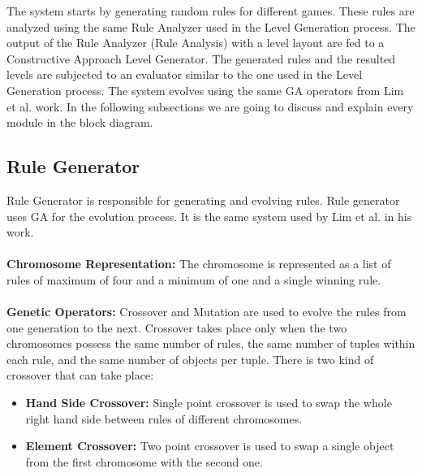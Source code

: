 
The system starts by generating random rules for different games. These rules are analyzed using the same Rule Analyzer used in the Level Generation process. The output of the Rule Analyzer (Rule Analysis) with a level layout are fed to a Constructive Approach Level Generator. The generated rules and the resulted levels are subjected to an evaluator similar to the one used in the Level Generation process. The system evolves using the same GA operators from Lim et al. work\cite{puzzleScriptGeneration}. In the following subsections we are going to discuss and explain every module in the block diagram.

\subsection{Rule Generator}
Rule Generator is responsible for generating and evolving rules. Rule generator uses GA for the evolution process. It is the same system used by Lim et al.\cite{puzzleScriptGeneration} in his work.\\\\
\textbf{Chromosome Representation:} The chromosome is represented as a list of rules of maximum of four and a minimum of one and a single winning rule. \\\\
\textbf{Genetic Operators:} Crossover and Mutation are used to evolve the rules from one generation to the next. Crossover takes place only when the two chromosomes possess the same number of rules, the same number of tuples within each rule, and the same number of objects per tuple. There is two kind of crossover that can take place:
\begin{itemize} \itemsep0pt \parskip0pt 
	\item \textbf{Hand Side Crossover:} Single point crossover is used to swap the whole right hand side between rules of different chromosomes.
	\item \textbf{Element Crossover:} Two point crossover is used to swap a single object from the first chromosome with the second one.
\end{itemize}

